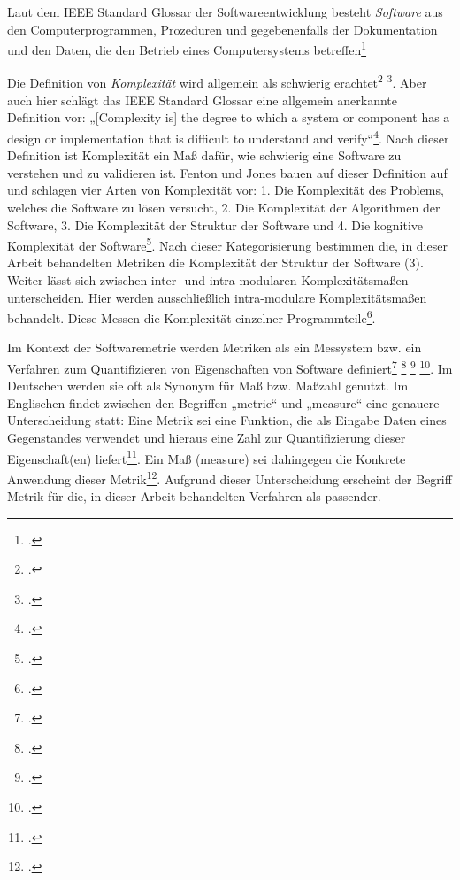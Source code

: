 Laut dem IEEE Standard Glossar der Softwareentwicklung besteht
\emph{Software} aus den Computerprogrammen, Prozeduren und
gegebenenfalls der Dokumentation und den Daten, die den Betrieb eines
Computersystems betreffen\footcite[Vgl. ][]{IEEEStandardGlossary S. 66}

Die Definition von \emph{Komplexität} wird allgemein als schwierig
erachtet\footcite[Vgl. ][]{Quelle fehlt} \footcite[Vgl. ][]{Jones 2008:335, Jones 2008:627}.
Aber auch hier schlägt das IEEE Standard Glossar eine allgemein
anerkannte Definition vor: „{[}Complexity is{]} the degree to which a
system or component has a design or implementation that is difficult to
understand and verify``\footcite[Vgl. ][]{O. V. o. J., S. 18}. Nach dieser
Definition ist Komplexität ein Maß dafür, wie schwierig eine Software zu
verstehen und zu validieren ist. Fenton und Jones bauen auf dieser
Definition auf und schlagen vier Arten von Komplexität vor: 1. Die
Komplexität des Problems, welches die Software zu lösen versucht, 2. Die
Komplexität der Algorithmen der Software, 3. Die Komplexität der
Struktur der Software und 4. Die kognitive Komplexität der
Software\footcite[Vgl. ][]{(fentonSoftwareMetricsRigorous2003 S. 258, Jones
  2008:449).}. Nach dieser Kategorisierung bestimmen die, in dieser
Arbeit behandelten Metriken die Komplexität der Struktur der Software
(3). Weiter lässt sich zwischen inter- und intra-modularen
Komplexitätsmaßen unterscheiden. Hier werden ausschließlich
intra-modulare Komplexitätsmaßen behandelt. Diese Messen die Komplexität
einzelner Programmteile\footcite[Vgl. ][]{Zuse, H. 1991, S. 7ff}.

Im Kontext der Softwaremetrie werden Metriken als ein Messystem bzw. ein
Verfahren zum Quantifizieren von Eigenschaften von Software
definiert\footcite[Vgl. ][]{dumkeTheorieUndPraxis1994 S. 35ff} \footcite[Vgl. ][]{ebertSoftwareMetrikenPraxisEinfuhrung1996
  S. 4ff} \footcite[Vgl. ][]{augstenWasSindSoftwaremetriken} \footcite[Vgl. ][]{IEEEStandardSoftware
  S. 2f}. Im Deutschen werden sie oft als Synonym für Maß bzw. Maßzahl
genutzt. Im Englischen findet zwischen den Begriffen „metric`` und
„measure`` eine genauere Unterscheidung statt: Eine Metrik sei eine
Funktion, die als Eingabe Daten eines Gegenstandes verwendet und hieraus
eine Zahl zur Quantifizierung dieser Eigenschaft(en) liefert\footcite[Vgl. ][]{IEEEStandardSoftware
  S. 3}. Ein Maß (measure) sei dahingegen die Konkrete Anwendung dieser
Metrik\footcite[Vgl. ][]{IEEEStandardSoftware S. 2}. Aufgrund dieser
Unterscheidung erscheint der Begriff Metrik für die, in dieser Arbeit
behandelten Verfahren als passender.

